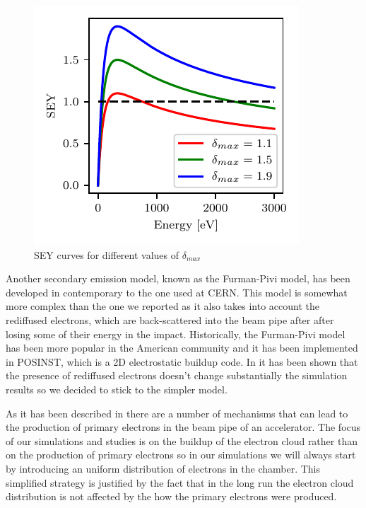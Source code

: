 \begin{figure}
    \centering
    \includegraphics{chapters/Chapter1/Figures/SEY_delta_max.pdf}
    \caption{SEY curves for different values of $\delta_{max}$}
    \label{fig:SEYcurvesdelta}
\end{figure}


\begin{Remark}
Another secondary emission model, known as the Furman-Pivi model, has been developed in contemporary to the one used at CERN. This model is somewhat more complex than the one we reported as it also takes into account the rediffused electrons, which are back-scattered into the beam pipe after after losing some of their energy in the impact.
Historically, the Furman-Pivi model has been more popular in the American community and it has been implemented in POSINST, which is a 2D electrostatic buildup code.
In \cite{Wulff:2683285} it has been shown that the presence of rediffused electrons doesn't change substantially the simulation results so we decided to stick to the simpler model.
\end{Remark}

\begin{Remark}
As it has been described in \cite{Iadarola:thesis} there are a number of mechanisms that can lead to the production of primary electrons in the beam pipe of an accelerator. The focus of our simulations and studies is on the buildup of the electron cloud rather than on the production of primary electrons so in our simulations we will always start by introducing an uniform distribution of electrons in the chamber. This simplified strategy is justified by the fact that in the long run the electron cloud distribution is not affected by the how the primary electrons were produced.
\end{Remark}


